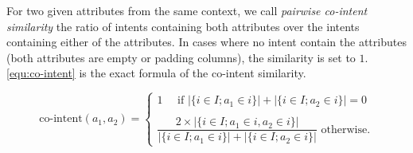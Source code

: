 \begin{definition}\label{def:co-intent}
For two given attributes from the same context, we call \emph{pairwise co-intent similarity} the ratio of intents containing both attributes over the intents containing either of the attributes.
In cases where no intent contain the attributes (both attributes are empty or padding columns), the similarity is set to $1$.
\autoref{equ:co-intent} is the exact formula of the co-intent similarity.
\end{definition}
\begin{equation}
\text{co-intent}(a_1, a_2) = 
%
\left\{
    \begin{array}{l}
        1 \text{~~~ if } |\{i\in I; a_1 \in i\}| + |\{i\in I; a_2 \in i\}| = 0 \\\\
        \dfrac{2 \times |\{i\in I; a_1 \in i, a_2 \in i\}|}{|\{i\in I; a_1 \in i\}| + |\{i\in I; a_2 \in i\}|} \text{ otherwise.}
    \end{array}
\right.
\label{equ:co-intent}
\end{equation}






